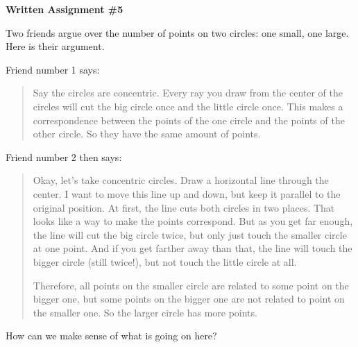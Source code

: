 \documentclass[12pt,letterpaper]{article}
\begin{document}
\setlength{\parskip}{1ex plus 0.5ex minus 0.2ex}
\setlength{\parindent}{0pt}

\pagestyle{fancy}
\lfoot{}
\rfoot{}

\begin{center}
{
\Large
\textbf{Written Assignment \#5}
}
\end{center}

Two friends argue over the number of points on two circles: one small, one large.
Here is their argument.

Friend number 1 says:
\begin{quote}
Say the circles are concentric. 
Every ray you draw from the center of the circles will cut the big circle once and the little circle once. 
This makes a correspondence between the points of the one circle and the points of the other circle.
So they have the same amount of points.
\end{quote}

Friend number 2 then says:
\begin{quotation}
Okay, let's take concentric circles. Draw a horizontal line through the center.
I want to move this line up and down, but keep it parallel to the original position.
At first, the line cuts both circles in two places. 
That looks like a way to make the points correspond.
But as you get far enough, the line will cut the big circle twice, but only just touch the smaller circle at one point. 
And if you get farther away than that, the line will touch the bigger circle (still twice!), but not touch the little circle at all.

Therefore, all points on the smaller circle are related to some point on the bigger one, but some points on the bigger one are not related to point on the smaller one.
So the larger circle has more points.
\end{quotation}

How can we make sense of what is going on here?
\vspace{1cm}
\begin{center}
\end{center}
\end{document}
